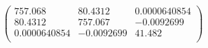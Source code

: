 \documentclass{article}
\begin{document}
\[\left(
\begin{array}{ccc}
 757.068 & 80.4312 & 0.0000640854 \\
 80.4312 & 757.067 & -0.0092699 \\
 0.0000640854 & -0.0092699 & 41.482 \\
\end{array}
\right)\]
\end{document}

